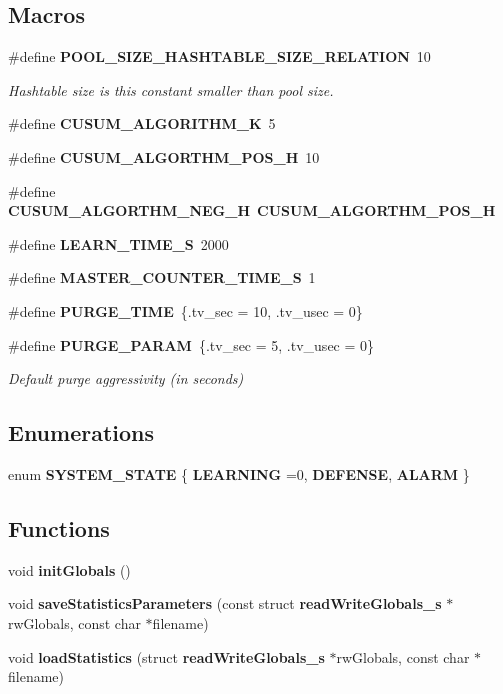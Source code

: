 \subsection*{Macros}
\begin{DoxyCompactItemize}
\item 
\#define {\bf P\+O\+O\+L\+\_\+\+S\+I\+Z\+E\+\_\+\+H\+A\+S\+H\+T\+A\+B\+L\+E\+\_\+\+S\+I\+Z\+E\+\_\+\+R\+E\+L\+A\+T\+I\+O\+N}~10
\begin{DoxyCompactList}\small\item\em Hashtable size is this constant smaller than pool size. \end{DoxyCompactList}\item 
\#define {\bf C\+U\+S\+U\+M\+\_\+\+A\+L\+G\+O\+R\+I\+T\+H\+M\+\_\+\+K}~5
\item 
\#define {\bf C\+U\+S\+U\+M\+\_\+\+A\+L\+G\+O\+R\+T\+H\+M\+\_\+\+P\+O\+S\+\_\+\+H}~10
\item 
\#define {\bf C\+U\+S\+U\+M\+\_\+\+A\+L\+G\+O\+R\+T\+H\+M\+\_\+\+N\+E\+G\+\_\+\+H}~{\bf C\+U\+S\+U\+M\+\_\+\+A\+L\+G\+O\+R\+T\+H\+M\+\_\+\+P\+O\+S\+\_\+\+H}
\item 
\#define {\bf L\+E\+A\+R\+N\+\_\+\+T\+I\+M\+E\+\_\+\+S}~2000
\item 
\#define {\bf M\+A\+S\+T\+E\+R\+\_\+\+C\+O\+U\+N\+T\+E\+R\+\_\+\+T\+I\+M\+E\+\_\+\+S}~1
\item 
\#define {\bf P\+U\+R\+G\+E\+\_\+\+T\+I\+M\+E}~\{.tv\+\_\+sec = 10, .tv\+\_\+usec = 0\}
\item 
\#define {\bf P\+U\+R\+G\+E\+\_\+\+P\+A\+R\+A\+M}~\{.tv\+\_\+sec = 5, .tv\+\_\+usec = 0\}
\begin{DoxyCompactList}\small\item\em Default purge aggressivity (in seconds) \end{DoxyCompactList}\end{DoxyCompactItemize}
\subsection*{Enumerations}
\begin{DoxyCompactItemize}
\item 
enum {\bf S\+Y\+S\+T\+E\+M\+\_\+\+S\+T\+A\+T\+E} \{ {\bf L\+E\+A\+R\+N\+I\+N\+G} =0, 
{\bf D\+E\+F\+E\+N\+S\+E}, 
{\bf A\+L\+A\+R\+M}
 \}
\end{DoxyCompactItemize}
\subsection*{Functions}
\begin{DoxyCompactItemize}
\item 
void {\bf init\+Globals} ()
\item 
void {\bf save\+Statistics\+Parameters} (const struct {\bf read\+Write\+Globals\+\_\+s} $\ast$rw\+Globals, const char $\ast$filename)
\item 
void {\bf load\+Statistics} (struct {\bf read\+Write\+Globals\+\_\+s} $\ast$rw\+Globals, const char $\ast$filename)
\end{DoxyCompactItemize}
